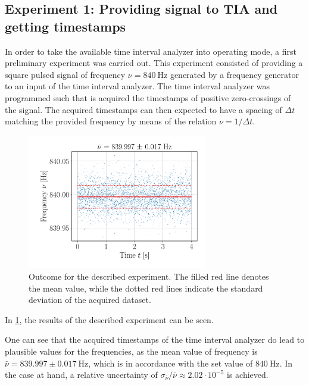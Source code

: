 \documentclass{report}
\numberwithin{tm}{section}
\begin{document}
\subsection{Experiment 1: Providing signal to TIA and getting timestamps}
In order to take the available time interval analyzer into operating mode, a first preliminary experiment was carried out. This experiment consisted of providing a square pulsed signal of frequency $\nu = \SI{840}{\hertz}$ generated by a frequency generator to an input of the time interval analyzer. The time interval analyzer was programmed such that is acquired the timestamps of positive zero-crossings of the signal. The acquired timestamps can then expected to have a spacing of $\Delta t$ matching the provided frequency by means of the relation $\nu = 1/\Delta t$.
\begin{figure}[h]
	\centering
	\includegraphics[width=0.7\textwidth]{figures/freq_prel_exp_scatter.pdf}
	\caption{Outcome for the described experiment. The filled red line denotes the mean value, while the dotted red lines indicate the standard deviation of the acquired dataset.}
	\label{fig:freq_prel_exp_scatter}
\end{figure}
In \cref{fig:freq_prel_exp_scatter}, the results of the described experiment can be seen. 

One can see that the acquired timestamps of the time interval analyzer do lead to plausible values for the frequencies, as the mean value of frequency is $\bar{\nu} = 839.997 \pm \SI{0.017}{\hertz}$, which is in accordance with the set value of $\SI{840}{\hertz}$. In the case at hand, a relative uncertainty of $\sigma_{\bar{\nu}}/\bar{\nu} \approx 2.02\cdot 10^{-5}$ is achieved.
\end{document}
